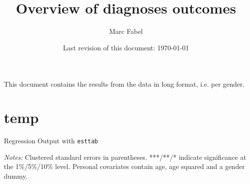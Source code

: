 \documentclass{scrartcl} %
\author{Marc Fabel}
\title{Overview of diagnoses outcomes}
\date{Last revision of this document: \today}
\begin{document}
\maketitle
This document contains the results from the data in long format, i.e. per gender.

\newpage


\section{temp}



%
%
%
%
\begin{table}[h] %
\begin{threeparttable}
\centering %
\caption{Regression Output with \texttt {esttab}} %
\label{table 1} %

\begin{tablenotes}
    \item \scriptsize 
\emph{Notes:} Clustered standard errors in parentheses. ***/**/* indicate significance at the 1\%/5\%/10\% level. Personal covariates contain age, age squared and a gender dummy.
    \end{tablenotes}
  \end{threeparttable}
\end{table}
\end{document}
